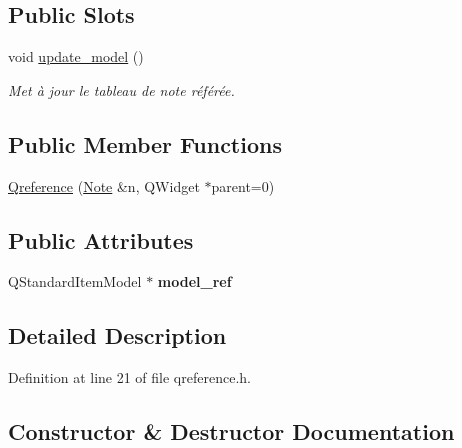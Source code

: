 \subsection*{Public Slots}
\begin{DoxyCompactItemize}
\item 
\mbox{\label{class_qreference_af2792e095c6033fa60f5f0fe273fa6a3}} 
void \hyperlink{class_qreference_af2792e095c6033fa60f5f0fe273fa6a3}{update\+\_\+model} ()
\begin{DoxyCompactList}\small\item\em Met à jour le tableau de note référée. \end{DoxyCompactList}\end{DoxyCompactItemize}
\subsection*{Public Member Functions}
\begin{DoxyCompactItemize}
\item 
\hyperlink{class_qreference_ab95224276a2abcdd26376291da58da47}{Qreference} (\hyperlink{class_note}{Note} \&n, Q\+Widget $\ast$parent=0)
\end{DoxyCompactItemize}
\subsection*{Public Attributes}
\begin{DoxyCompactItemize}
\item 
\mbox{\label{class_qreference_aba2c9456cb52bed2104c88d0bc727ac1}} 
Q\+Standard\+Item\+Model $\ast$ {\bfseries model\+\_\+ref}
\end{DoxyCompactItemize}


\subsection{Detailed Description}


Definition at line 21 of file qreference.\+h.



\subsection{Constructor \& Destructor Documentation}
\mbox{\label{class_qreference_ab95224276a2abcdd26376291da58da47}} 
